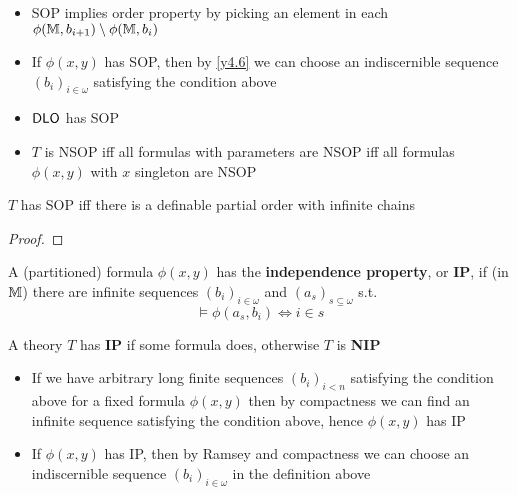\documentclass[11pt]{article}
\begin{document}
\begin{remark}
\begin{itemize}
\item SOP implies order property by picking an element in each \(\phi(\mathbb{M},b_{i+1})\setminus\phi(\mathbb{M},b_i)\)
\item If \(\phi(x,y)\) has SOP, then by \ref{y4.6} we can choose an indiscernible sequence \((b_i)_{i\in\omega}\)
satisfying the condition above
\item \(\operatorname{\textsf{DLO}}\) has SOP
\item \(T\) is NSOP iff all formulas with parameters are NSOP iff all formulas \(\phi(x,y)\) with \(x\)
singleton are NSOP
\end{itemize}
\end{remark}

\begin{exercise}
\label{Problem6}
\(T\) has SOP iff there is a definable partial order with infinite chains
\end{exercise}

\begin{proof}

\end{proof}

\begin{definition}[NIP]
A (partitioned) formula \(\phi(x,y)\) has the \textbf{independence property}, or \textbf{IP}, if (in \(\mathbb{M}\)) there are
infinite sequences \((b_i)_{i\in\omega}\) and \((a_s)_{s\subseteq\omega}\) s.t.
\begin{equation*}
\vDash\phi(a_s,b_i)\Leftrightarrow i\in s
\end{equation*}

A theory \(T\) has \textbf{IP} if some formula does, otherwise \(T\) is \textbf{NIP}
\end{definition}

\begin{remark}
\begin{itemize}
\item If we have arbitrary long finite sequences \((b_i)_{i<n}\) satisfying the condition above for a
fixed formula \(\phi(x,y)\) then by compactness we can find an infinite sequence satisfying the
condition above, hence \(\phi(x,y)\) has IP
\item If \(\phi(x,y)\) has IP, then by Ramsey and compactness we can choose an indiscernible
sequence \((b_i)_{i\in\omega}\) in the definition above
\end{itemize}
\end{remark}
\end{document}
